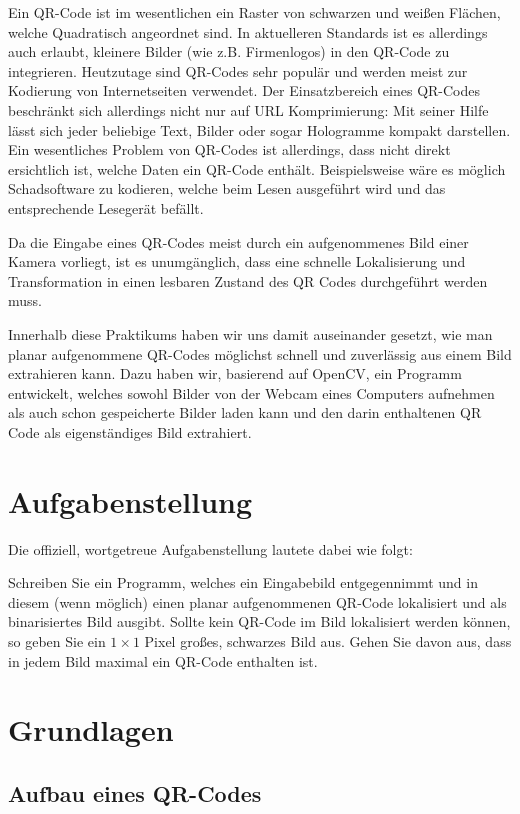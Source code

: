 \documentclass[a4paper, oneside, 12pt]{article}
\begin{document}
Ein QR-Code ist im wesentlichen ein Raster von schwarzen und weißen Flächen, welche Quadratisch angeordnet sind. In aktuelleren Standards ist es allerdings auch erlaubt, kleinere Bilder (wie z.B. Firmenlogos) in den QR-Code zu integrieren. Heutzutage sind QR-Codes sehr populär und werden meist zur Kodierung von Internetseiten verwendet. Der Einsatzbereich eines QR-Codes beschränkt sich allerdings nicht nur auf URL Komprimierung: Mit seiner Hilfe lässt sich jeder beliebige Text, Bilder oder sogar Hologramme kompakt darstellen. Ein wesentliches Problem von QR-Codes ist allerdings, dass nicht direkt ersichtlich ist, welche Daten ein QR-Code enthält. Beispielsweise wäre es möglich Schadsoftware zu kodieren, welche beim Lesen ausgeführt wird und das entsprechende Lesegerät befällt.

Da die Eingabe eines QR-Codes meist durch ein aufgenommenes Bild einer Kamera vorliegt, ist es unumgänglich, dass eine schnelle Lokalisierung und Transformation in einen lesbaren Zustand des QR Codes durchgeführt werden muss.

Innerhalb diese Praktikums haben wir uns damit auseinander gesetzt, wie man planar aufgenommene QR-Codes möglichst schnell und zuverlässig aus einem Bild extrahieren kann. Dazu haben wir, basierend auf OpenCV, ein Programm entwickelt, welches sowohl Bilder von der Webcam eines Computers aufnehmen als auch schon gespeicherte Bilder laden kann und den  darin enthaltenen QR Code als eigenständiges Bild extrahiert.

\section{Aufgabenstellung}
\label{s:aufgabenstellung}
Die offiziell, wortgetreue Aufgabenstellung lautete dabei wie folgt:

Schreiben Sie ein Programm, welches ein Eingabebild entgegennimmt und in diesem (wenn möglich) einen planar aufgenommenen QR-Code lokalisiert und als binarisiertes Bild ausgibt. Sollte kein QR-Code im Bild lokalisiert werden können, so geben Sie ein $1 \! \times \! 1$ Pixel großes, schwarzes Bild aus. Gehen Sie davon aus, dass in jedem Bild maximal ein QR-Code enthalten ist.


\newpage

\section{Grundlagen}
\label{s:grundlagen}

\subsection{Aufbau eines QR-Codes}
\label{ss:aufbau}
\end{document}
